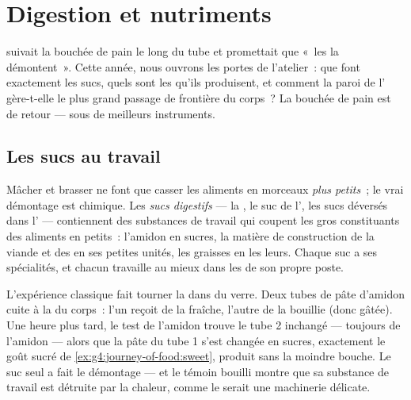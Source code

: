 \chapter{Digestion et nutriments}\label{ch:g7:digestion-and-nutrients}

 suivait la bouchée de pain le long du
tube et promettait que «~les  la démontent~». Cette
année, nous ouvrons les portes de l'atelier~: que font exactement
les sucs, quels sont les  qu'ils produisent, et comment la
paroi de l' gère-t-elle le plus grand passage de
frontière du corps~? La bouchée de pain est de retour --- sous de
meilleurs instruments.

\section{Les sucs au travail}

\begin{proposition}\label{prop:g7:digestion-and-nutrients:chemical}
Mâcher et brasser ne font que casser les aliments en morceaux
\emph{plus petits}~; le vrai démontage est chimique. Les \emph{sucs
digestifs} --- la , le suc de l',
les sucs déversés dans l' --- contiennent des
substances de travail qui coupent les gros constituants des aliments
en petits~: l'amidon en sucres, la matière de construction de la
viande et des  en ses petites unités, les graisses en les leurs.
Chaque suc a ses spécialités, et chacun travaille au mieux dans les
 de son propre poste.
\end{proposition}
\admitted

\begin{example}\label{ex:g7:digestion-and-nutrients:bench}
L'expérience classique fait tourner la  dans du verre. Deux
tubes de pâte d'amidon cuite à la  du corps~: l'un reçoit
de la  fraîche, l'autre de la  bouillie (donc gâtée). Une
heure plus tard, le test de l'amidon trouve le tube 2 inchangé ---
toujours de l'amidon --- alors que la pâte du tube 1 s'est changée
en sucres, exactement le goût sucré de
\cref{ex:g4:journey-of-food:sweet}, produit sans la moindre bouche.
Le suc seul a fait le démontage --- et le témoin bouilli montre que
sa substance de travail est détruite par la chaleur, comme le serait
une machinerie délicate.
\end{example}

